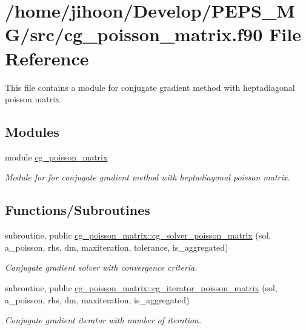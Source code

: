 \hypertarget{cg__poisson__matrix_8f90}{}\section{/home/jihoon/\+Develop/\+P\+E\+P\+S\+\_\+\+M\+G/src/cg\+\_\+poisson\+\_\+matrix.f90 File Reference}
\label{cg__poisson__matrix_8f90}


This file contains a module for conjugate gradient method with heptadiagonal poisson matrix.  


\subsection*{Modules}
\begin{DoxyCompactItemize}
\item 
module \hyperlink{namespacecg__poisson__matrix}{cg\+\_\+poisson\+\_\+matrix}
\begin{DoxyCompactList}\small\item\em Module for for conjugate gradient method with heptadiagonal poisson matrix. \end{DoxyCompactList}\end{DoxyCompactItemize}
\subsection*{Functions/\+Subroutines}
\begin{DoxyCompactItemize}
\item 
subroutine, public \hyperlink{namespacecg__poisson__matrix_a4762a692c1b2dd5070d070e90a30e8cd}{cg\+\_\+poisson\+\_\+matrix\+::cg\+\_\+solver\+\_\+poisson\+\_\+matrix} (sol, a\+\_\+poisson, rhs, dm, maxiteration, tolerance, is\+\_\+aggregated)
\begin{DoxyCompactList}\small\item\em Conjugate gradient solver with convergence criteria. \end{DoxyCompactList}\item 
subroutine, public \hyperlink{namespacecg__poisson__matrix_a558093032b9b1f54bf1bde7bfa847829}{cg\+\_\+poisson\+\_\+matrix\+::cg\+\_\+iterator\+\_\+poisson\+\_\+matrix} (sol, a\+\_\+poisson, rhs, dm, maxiteration, is\+\_\+aggregated)
\begin{DoxyCompactList}\small\item\em Conjugate gradient iterator with number of iteration. \end{DoxyCompactList}\end{DoxyCompactItemize}


